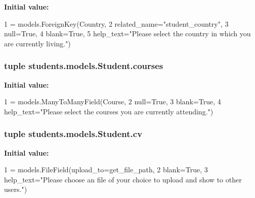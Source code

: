 {\bfseries Initial value\-:}
\begin{DoxyCode}
1 = models.ForeignKey(Country,
2                                 related\_name=\textcolor{stringliteral}{"student\_country"},
3                                 null=\textcolor{keyword}{True},
4                                 blank=\textcolor{keyword}{True},
5                                 help\_text=\textcolor{stringliteral}{"Please select the country in which you are currently living."})
\end{DoxyCode}
\hypertarget{classstudents_1_1models_1_1_student_a08fe0c93f50c6a1699ff506a76ef3172}{
\subsubsection[{courses}]{\setlength{\rightskip}{0pt plus 5cm}tuple students.\-models.\-Student.\-courses\hspace{0.3cm}{\ttfamily [static]}}}\label{classstudents_1_1models_1_1_student_a08fe0c93f50c6a1699ff506a76ef3172}
{\bfseries Initial value\-:}
\begin{DoxyCode}
1 = models.ManyToManyField(Course,
2                                      null=\textcolor{keyword}{True},
3                                      blank=\textcolor{keyword}{True},
4                                      help\_text=\textcolor{stringliteral}{"Please select the courses you are currently attending."})
\end{DoxyCode}
\hypertarget{classstudents_1_1models_1_1_student_ad1da7d6dcdd52dcef337cf689b329e19}{
\subsubsection[{cv}]{\setlength{\rightskip}{0pt plus 5cm}tuple students.\-models.\-Student.\-cv\hspace{0.3cm}{\ttfamily [static]}}}\label{classstudents_1_1models_1_1_student_ad1da7d6dcdd52dcef337cf689b329e19}
{\bfseries Initial value\-:}
\begin{DoxyCode}
1 = models.FileField(upload\_to=get\_file\_path,
2                           blank=\textcolor{keyword}{True},
3                           help\_text=\textcolor{stringliteral}{"Please choose an file of your choice to upload and show to other
       users."})
\end{DoxyCode}
